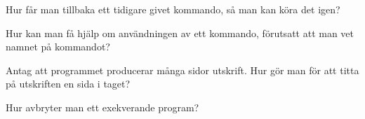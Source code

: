\item Hur får man tillbaka ett tidigare givet kommando, så man kan köra det igen?
\qskip
\item Hur kan man få hjälp om användningen av ett kommando, förutsatt att man vet namnet på kommandot?
\qskip
\item Antag att programmet  producerar många sidor utskrift. Hur gör man för att titta på utskriften en sida i taget?
\qskip
\item Hur avbryter man ett exekverande program?
